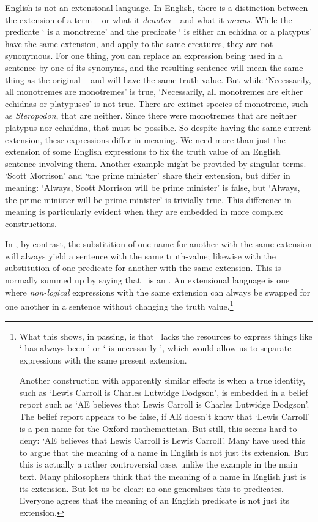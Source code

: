 English is not an extensional language. In English, there is a distinction between the extension of a term – or what it \emph{denotes} – and what it \emph{means}. While the predicate `\gap{} is a monotreme' and the predicate `\gap{} is either an echidna or a platypus' have the same extension, and apply to the same creatures, they are not synonymous. For one thing, you can replace an expression being used in a sentence by one of its synonyms, and the resulting sentence will mean the same thing as the original – and will have the same truth value. But while `Necessarily, all monotremes are monotremes' is true, `Necessarily, all monotremes are either echidnas or platypuses' is not true. There are extinct species of monotreme, such as \emph{Steropodon}, that are neither. Since there were monotremes that are neither platypus nor echnidna, that must be possible. So despite having the same current extension, these expressions differ in meaning. We need more than just the extension of some English expressions to fix the truth value of an English sentence involving them. Another example might be provided by singular terms. `Scott Morrison' and `the prime minister' share their extension, but differ in meaning: `Always, Scott Morrison will be prime minister' is false, but `Always, the prime minister will be prime minister' is trivially true. This difference in meaning is particularly evident when they are embedded in more complex constructions. 


In \FOL, by contrast, the substitition of one name for another with the same extension will always yield a sentence with the same truth-value; likewise with the substitution of one predicate for another with the same extension. This is normally summed up by saying that \FOL\ is an . An extensional language is one where \emph{non-logical} expressions with the same extension can always be swapped for one another in a sentence without changing the truth value.\footnote{What this shows, in passing, is that \FOL\ lacks the resources to express things like `\gap{} has always been \gap{}' or `\gap{} is necessarily \gap{}', which would allow us to separate expressions with the same present extension. 

Another construction with apparently similar effects is when a true identity, such as `Lewis Carroll is Charles Lutwidge Dodgson', is embedded in a belief report such as `AE believes that Lewis Carroll is Charles Lutwidge Dodgson'. The belief report appears to be false, if AE doesn't know that `Lewis Carroll' is a pen name for the Oxford mathematician. But still, this seems hard to deny: `AE believes that Lewis Carroll is Lewis Carroll'. Many have used this to argue that the meaning of a name in English is not just its extension. But this is actually a rather controversial case, unlike the example in the main text. Many philosophers think that the meaning of a name in English just is its extension. But let us be clear: no one generalises this to predicates. Everyone agrees that the meaning of an English predicate is not just its extension.}

